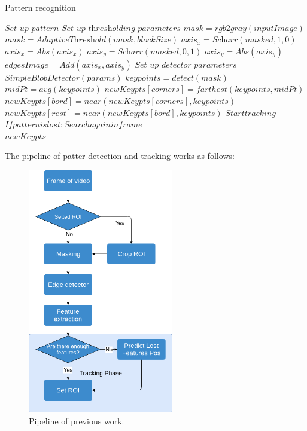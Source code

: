 \documentclass[journal]{IEEEtran}
\begin{document}
\begin{algorithm}
\caption{Pattern recognition}
\begin{algorithmic}[1]
\State $\textit{Set up pattern}$
\State $\textit{Set up thresholding parameters}$
\State $mask   = \textit{rgb2gray}( inputImage )$
\State $mask   = \textit{AdaptiveThreshold}(mask, blockSize)$
\State $axis_x   = \textit{Scharr}(masked, 1, 0)$
\State $axis_x   = \textit{Abs}(axis_x)$
\State $axis_y   = \textit{Scharr}(masked, 0, 1)$
\State $axis_y   = \textit{Abs}(axis_y)$
\State $edgesImage   = \textit{Add}(axis_x, axis_y)$ 
\State $\textit{Set up detector parameters}$
\State $\textit{SimpleBlobDetector}(params)$
\State $keypoints   = \textit{detect}(mask)$ 
\State $midPt   = \textit{avg}(keypoints)$
\State $newKeypts[corners] = farthest(keypoints, midPt)$
\State $newKeypts[bord] = near(newKeypts[corners], keypoints)$
\State $newKeypts[rest] = near(newKeypts[bord], keypoints)$
\State $Start tracking$
\State $If pattern is lost: Search again in frame$\\
\Return $newKeypts$
\end{algorithmic}
\end{algorithm}

The pipeline of patter detection and tracking works as follows:

\begin{figure}[H]
\centering
\includegraphics[width=2.5in]{_img/algorithm_overview.png}
\caption{Pipeline of previous work.}
\end{figure}
\end{document}
